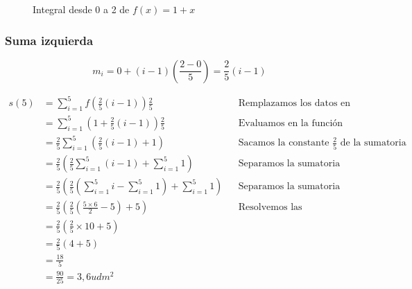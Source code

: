 \documentclass{templateNote}
\begin{document}
\begin{figure}[H]
    \centering
    \caption{Integral desde 0 a 2 de $f(x)=1+x$}
\end{figure}

\newpage
\subsubsection{Suma izquierda}
\[
    m_i = 0 + (i-1) \left( \frac{2-0}{5} \right) = \frac{2}{5}(i-1)
\]

\begin{align*}
    s(5) &= \sum_{i=1}^{5}f\left(\frac{2}{5}(i-1)\right)\frac{2}{5} && \text{Remplazamos los datos en la ecuación} \\
    &= \sum_{i=1}^{5} \left(1+\frac{2}{5}(i-1)\right)\frac{2}{5} && \text{Evaluamos en la función} \\
    &= \frac{2}{5} \sum_{i=1}^{5} \left( \frac{2}{5}(i-1) + 1 \right) && \text{Sacamos la constante $\frac{2}{5}$ de la sumatoria} \\
    &= \frac{2}{5} \left( \frac{2}{5} \sum_{i=1}^{5}(i-1) + \sum_{i=1}^{5}1\right) && \text{Separamos la sumatoria} \\
    &= \frac{2}{5} \left( \frac{2}{5} \left(\sum_{i=1}^{5}i - \sum_{i=1}^{5}1\right) + \sum_{i=1}^{5}1\right) && \text{Separamos la sumatoria} \\
    &= \frac{2}{5} \left( \frac{2}{5} \left(\frac{5 \times 6}{2} - 5\right) + 5\right) && \text{Resolvemos las sumatorias} \\
    &= \frac{2}{5} \left( \frac{2}{5} \times 10 + 5\right) \\
    &= \frac{2}{5} \left( 4 + 5\right) \\
    &= \frac{18}{5} \\
    &= \frac{90}{25} = 3,6udm^2\\
\end{align*}
\end{document}
